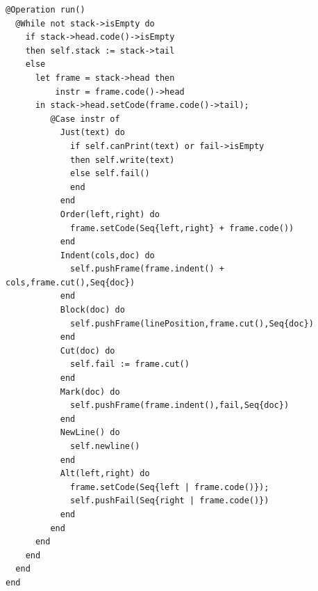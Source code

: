 \begin{lstlisting}
@Operation run()
  @While not stack->isEmpty do
    if stack->head.code()->isEmpty
    then self.stack := stack->tail
    else
      let frame = stack->head then
          instr = frame.code()->head 
      in stack->head.setCode(frame.code()->tail);
         @Case instr of
           Just(text) do
             if self.canPrint(text) or fail->isEmpty
             then self.write(text)
             else self.fail() 
             end
           end
           Order(left,right) do
             frame.setCode(Seq{left,right} + frame.code()) 
           end
           Indent(cols,doc) do
             self.pushFrame(frame.indent() + cols,frame.cut(),Seq{doc})
           end
           Block(doc) do
             self.pushFrame(linePosition,frame.cut(),Seq{doc})
           end
           Cut(doc) do 
             self.fail := frame.cut()
           end
           Mark(doc) do
             self.pushFrame(frame.indent(),fail,Seq{doc})
           end
           NewLine() do
             self.newline()
           end
           Alt(left,right) do
             frame.setCode(Seq{left | frame.code()});
             self.pushFail(Seq{right | frame.code()})
           end
         end
      end
    end
  end
end
\end{lstlisting}%

